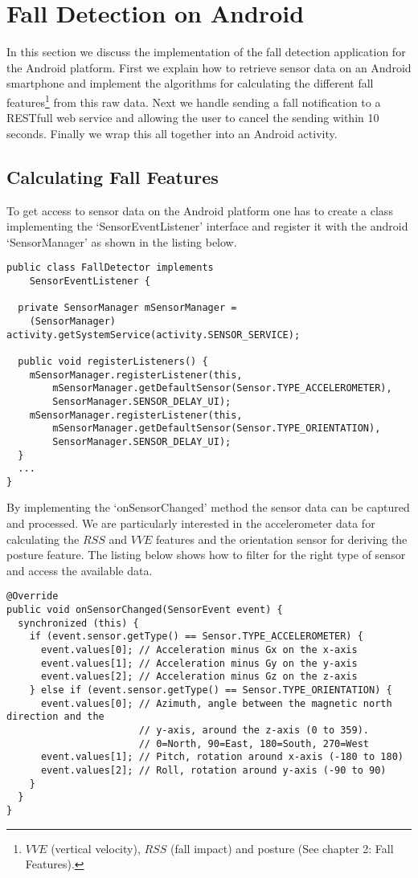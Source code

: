 \documentclass[a4paper, 10pt]{article}
\begin{document}
\section{Fall Detection on Android}
In this section we discuss the implementation of the fall detection application for the Android platform. First we explain how to retrieve sensor data on an Android smartphone and implement the algorithms for calculating the different fall features\footnote{$VVE$ (vertical velocity), $RSS$ (fall impact) and posture (See chapter 2: Fall Features).} from this raw data. Next we handle sending a fall notification to a RESTfull web service and allowing the user to cancel the sending within 10 seconds. Finally we wrap this all together into an Android activity.

\subsection{Calculating Fall Features}
To get access to sensor data on the Android platform one has to create a class implementing the `SensorEventListener' interface and register it with the android `SensorManager' as shown in the listing below.
\begin{lstlisting}
public class FallDetector implements
    SensorEventListener {
    
  private SensorManager mSensorManager = 
    (SensorManager) activity.getSystemService(activity.SENSOR_SERVICE);
    
  public void registerListeners() {
    mSensorManager.registerListener(this,
        mSensorManager.getDefaultSensor(Sensor.TYPE_ACCELEROMETER),
        SensorManager.SENSOR_DELAY_UI);
    mSensorManager.registerListener(this,
        mSensorManager.getDefaultSensor(Sensor.TYPE_ORIENTATION),
        SensorManager.SENSOR_DELAY_UI);
  }  
  ...  
}
\end{lstlisting}
\newpage
By implementing the `onSensorChanged' method the sensor data can be captured and processed. We are particularly interested in the accelerometer data for calculating the $RSS$ and $VVE$ features and the orientation sensor for deriving the posture feature. The listing below shows how to filter for the right type of sensor and access the available data.
\begin{lstlisting}
@Override
public void onSensorChanged(SensorEvent event) {
  synchronized (this) {
    if (event.sensor.getType() == Sensor.TYPE_ACCELEROMETER) {
      event.values[0]; // Acceleration minus Gx on the x-axis
      event.values[1]; // Acceleration minus Gy on the y-axis
      event.values[2]; // Acceleration minus Gz on the z-axis
    } else if (event.sensor.getType() == Sensor.TYPE_ORIENTATION) {      
      event.values[0]; // Azimuth, angle between the magnetic north direction and the
                       // y-axis, around the z-axis (0 to 359). 
                       // 0=North, 90=East, 180=South, 270=West
      event.values[1]; // Pitch, rotation around x-axis (-180 to 180)
      event.values[2]; // Roll, rotation around y-axis (-90 to 90)
    }
  }
}
\end{lstlisting}
\end{document}
